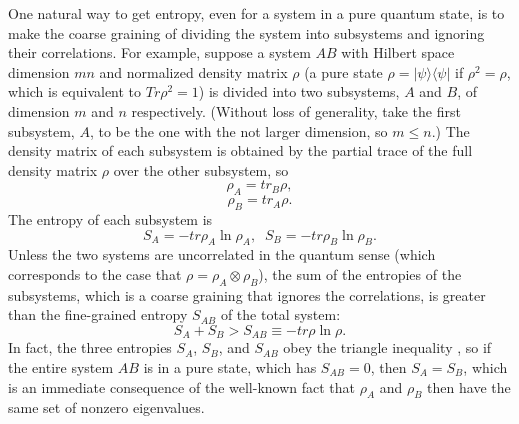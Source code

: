      One natural way to get entropy, even for a system in a pure
quantum state,
is to make the coarse graining of dividing the system into subsystems
and
ignoring their correlations.  For example, suppose a system $AB$ with
Hilbert
space dimension $mn$ and normalized density matrix $\rho$ (a pure
state $\rho =
|\psi\rangle\langle\psi|$ if $\rho^2 = \rho$, which is equivalent to
$Tr \rho^2
= 1$) is divided into two subsystems, $A$ and $B$, of dimension $m$
and $n$
respectively.  (Without loss of generality, take the first subsystem,
$A$, to
be the one with the not larger dimension, so $m\leq n$.)  The density
matrix of
each subsystem is obtained by the partial trace of the full density
matrix
$\rho$ over the other subsystem, so
	\begin{equation}
        \rho_{A}={tr}_B\rho,
	\end{equation}
	\begin{equation}
	\rho_{B}={tr}_A\rho.
	\end{equation}
The entropy of each subsystem is
	\begin{equation}
	S_A=-tr\rho_A \ln \rho_A,\;\;S_B=-tr\rho_B \ln \rho_B.
	\end{equation}
Unless the two systems are uncorrelated in the quantum sense (which
corresponds
to the case that $\rho=\rho_A\otimes \rho_B$), the sum of the
entropies of the
subsystems, which is a coarse graining that ignores the correlations,
is
greater than the fine-grained entropy $S_{AB}$ of the total system:
	\begin{equation}
	S_A+S_B > S_{AB} \equiv -tr\rho \ln \rho.
	\end{equation}
In fact, the three entropies $S_A$, $S_B$, and $S_{AB}$ obey the
triangle
inequality \cite{A}, so if the entire system $AB$ is in a pure state,
which has
$S_{AB}=0$, then $S_A=S_B$, which is an immediate consequence of the
well-known
fact that $\rho_A$ and $\rho_B$ then have the same set of nonzero
eigenvalues.

